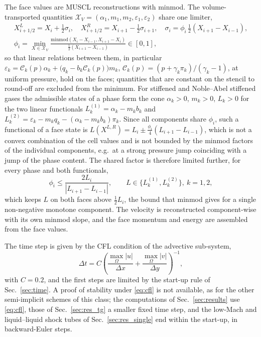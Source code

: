The face values are MUSCL reconstructions \cite{vanLeer1979} with minmod. The volume-transported quantities
$\mathcal X_V=(\alpha_1,m_1,m_2,\varepsilon_1,\varepsilon_2)$ share one limiter,
\begin{equation}
\begin{gathered}
X^L_{i+1/2}=X_i+\tfrac12\sigma_i,\quad X^R_{i+1/2}=X_{i+1}-\tfrac12\sigma_{i+1},\quad \sigma_i=\phi_i\,\tfrac12(X_{i+1}-X_{i-1}),\\
\phi_i=\min_{X\in\mathcal X_V}\frac{\mathrm{minmod}(X_i-X_{i-1},X_{i+1}-X_i)}{\tfrac12(X_{i+1}-X_{i-1})}\in[0,1],
\end{gathered}
\label{eq:shared_limiter}
\end{equation}
so that linear relations between them, in particular $\varepsilon_k=\mathcal C_k(p)\alpha_k+\big(q_k-b_k\mathcal C_k(p)\big)m_k$, $\mathcal C_k(p)=(p+\gamma_k\pi_k)/(\gamma_k-1)$, at
uniform pressure, hold on the faces; quantities that are constant on the stencil to round-off are excluded from the minimum.
For stiffened and Noble--Abel stiffened gases the admissible states of a phase form the cone $\alpha_k>0$, $m_k>0$, $L_k>0$ for the
two linear functionals $L^{(1)}_k=\alpha_k-m_kb_k$ and $L^{(2)}_k=\varepsilon_k-m_kq_k-(\alpha_k-m_kb_k)\pi_k$. Since all components share $\phi_i$, such a
functional of a face state is $L(X^{L,R})=L_i\pm\tfrac{\phi_i}4(L_{i+1}-L_{i-1})$, which is not a convex combination of the cell values and is not
bounded by the minmod factors of the individual components, e.g.\ at a strong pressure jump coinciding with a jump of
the phase content. The shared factor is therefore limited further, for every phase and both functionals,
\begin{equation}
\phi_i\le\frac{2L_i}{|L_{i+1}-L_{i-1}|},\qquad L\in\{L^{(1)}_k,L^{(2)}_k\},\ k=1,2 ,
\label{eq:phi_cap}
\end{equation}
which keeps $L$ on both faces above $\tfrac12L_i$, the bound that minmod gives for a single non-negative monotone component. The velocity is reconstructed component-wise with its own minmod slope, and the face
momentum and energy are assembled from the face values.

The time step is given by the CFL condition of the advective sub-system,
\begin{equation}
\Delta t=C\left(\frac{\max_\Omega|u|}{\Delta x}+\frac{\max_\Omega|v|}{\Delta y}\right)^{-1},
\label{eq:cfl}
\end{equation}
with $C=0.2$, and the first steps are limited by the
start-up rule of Sec.~\ref{sec:time}. A proof of stability under \eqref{eq:cfl} is not available, as for the
other semi-implicit schemes of this class; the computations of Sec.~\ref{sec:results} use \eqref{eq:cfl}, those of
Sec.~\ref{sec:res_tg} a smaller fixed time step, and the low-Mach and liquid--liquid shock tubes of Sec.~\ref{sec:res_single}
end within the start-up, in backward-Euler steps.

